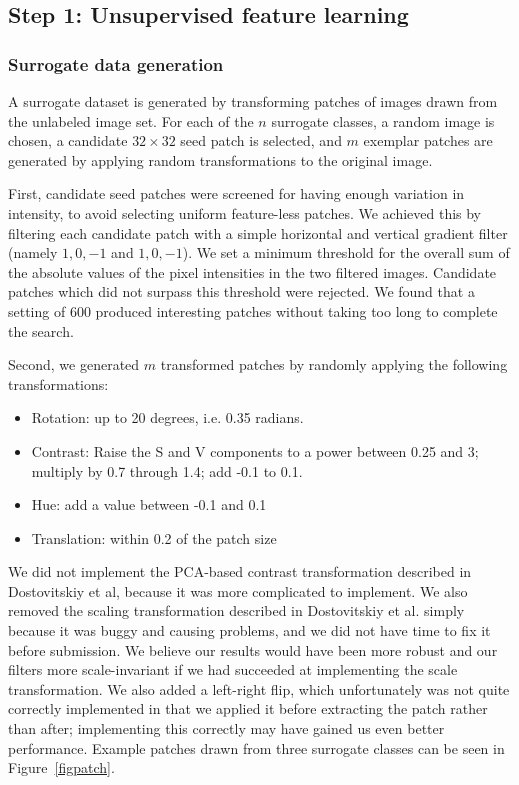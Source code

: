 \documentclass{article} %
\newenvironment{itemizedense}{
\begin{itemize}
  \setlength{\itemsep}{1pt}
  \setlength{\parskip}{0pt}
  \setlength{\parsep}{0pt}
}{\end{itemize}}
\begin{document}
\subsection{Step 1: Unsupervised feature learning}

\subsubsection{Surrogate data generation}

A surrogate dataset is generated by transforming patches of images drawn from the unlabeled image set. For each of the $n$ surrogate classes, a random image is chosen, a candidate $32\times32$ seed patch is selected, and $m$ exemplar patches are generated by applying random transformations to the original image.

First, candidate seed patches were screened for having enough variation in intensity, to avoid selecting uniform feature-less patches. We achieved this by filtering each candidate patch with a simple horizontal and vertical gradient filter (namely ${{1, 0, -1}}$ and ${{1},{0},{-1}}$). We set a minimum threshold for the overall sum of the absolute values of the pixel intensities in the two filtered images. Candidate patches which did not surpass this threshold were rejected. We found that a setting of $600$ produced interesting patches without taking too long to complete the search. 

Second, we generated $m$ transformed patches by randomly applying the following transformations:

\begin{itemizedense}
\item Rotation: up to 20 degrees, i.e. 0.35 radians.
\item Contrast: Raise the S and V components to a power between 0.25 and 3; multiply by 0.7 through 1.4; add -0.1 to 0.1.
\item Hue: add a value between -0.1 and 0.1
\item Translation: within 0.2 of the patch size
\end{itemizedense}

We did not implement the PCA-based contrast transformation described in Dostovitskiy et al, because it was more complicated to implement. We also removed the scaling transformation described in Dostovitskiy et al. simply because it was buggy and causing problems, and we did not have time to fix it before submission. We believe our results would have been more robust and our filters more scale-invariant if we had succeeded at implementing the scale transformation. We also added a left-right flip, which unfortunately was not quite correctly implemented in that we applied it before extracting the patch rather than after; implementing this correctly may have gained us even better performance. Example patches drawn from three surrogate classes can be seen in Figure~\ref{figpatch}.
\end{document}
